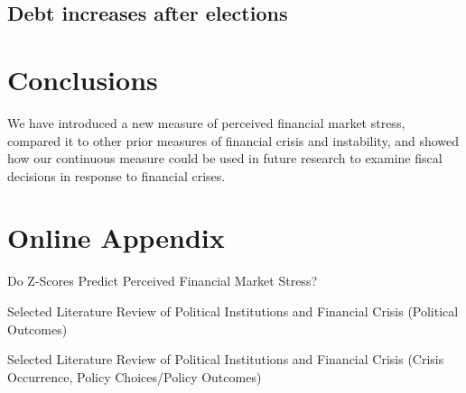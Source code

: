 \documentclass[]{article}
\begin{document}
\subsection{Debt increases after elections}



\section{Conclusions}\label{conclusions}

We have introduced a new measure of perceived financial market stress, compared it to other prior measures of financial crisis and instability, and showed how our continuous measure could be used in future research to examine fiscal decisions in response to financial crises.




\clearpage

\section*{Online Appendix}


\begin{table}
    \caption{Do Z-Scores Predict Perceived Financial Market Stress?}
    \label{epfms_z_regress}

    \begin{center}
        
    \end{center}
\end{table}



\begin{table}[H]
\caption{Selected Literature Review of Political Institutions and Financial
Crisis (Political Outcomes)}


\label{LitRevTable2}
\begin{center}

\vspace{0.5cm}
\scalebox{0.9}{

}
\end{center}
\end{table}

\begin{table}[H]
\caption{Selected Literature Review of Political Institutions and Financial
Crisis (Crisis Occurrence, Policy Choices/Policy Outcomes)}


\label{LitRevTable}
\begin{center}

\vspace{0.5cm}
{\tiny{

}}
\end{center}
\end{table}
\end{document}
